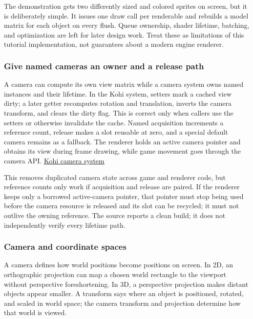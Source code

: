 The demonstration gets two differently sized and colored sprites on screen, but it is deliberately simple. It issues one draw call per renderable and rebuilds a model matrix for each object on every flush. Queue ownership, shader lifetime, batching, and optimization are left for later design work. Treat these as limitations of this tutorial implementation, not guarantees about a modern engine renderer.

\subsubsection{Give named cameras an owner and a release path}\label{06-engine-ii-ch025-give-named-cameras-an-owner-and-a-release-path}

A camera can compute its own view matrix while a camera system owns named instances and their lifetime. In the Kohi system, setters mark a cached view dirty; a later getter recomputes rotation and translation, inverts the camera transform, and clears the dirty flag. This is correct only when callers use the setters or otherwise invalidate the cache. Named acquisition increments a reference count, release makes a slot reusable at zero, and a special default camera remains as a fallback. The renderer holds an active camera pointer and obtains its view during frame drawing, while game movement goes through the camera API. \href{https://www.youtube.com/watch?v=6UMJzh1RdOo}{Kohi camera system}

This removes duplicated camera state across game and renderer code, but reference counts only work if acquisition and release are paired. If the renderer keeps only a borrowed active-camera pointer, that pointer must stop being used before the camera resource is released and its slot can be recycled; it must not outlive the owning reference. The source reports a clean build; it does not independently verify every lifetime path.

\subsubsection{Camera and coordinate spaces}\label{06-engine-ii-ch025-camera-and-coordinate-spaces}

A camera defines how world positions become positions on screen. In 2D, an orthographic projection can map a chosen world rectangle to the viewport without perspective foreshortening. In 3D, a perspective projection makes distant objects appear smaller. A transform says where an object is positioned, rotated, and scaled in world space; the camera transform and projection determine how that world is viewed.

